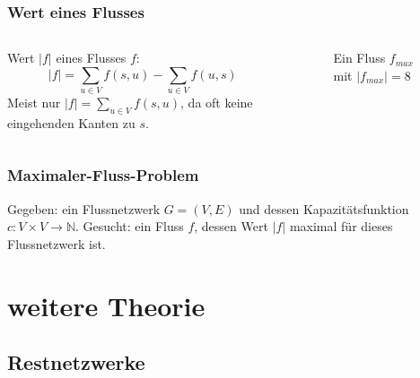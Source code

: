 \documentclass{beamer}
\begin{document}
\begin{frame}
\frametitle{Wert eines Flusses}
\begin{columns}
\begin{column}{.45\textwidth}
Wert $\lvert f \rvert$ eines Flusses $f$:
\begin{equation}
\lvert f \rvert = \sum_{u\in V} f(s,u) - \sum_{u\in V} f(u,s) \nonumber
\end{equation}
Meist nur $\lvert f \rvert = \sum_{u\in V} f(s,u)$, da oft keine eingehenden Kanten zu $s$.
\end{column}
\hfill
\pause
\begin{column}{.45\textwidth}
\begin{figure}
\begin{adjustbox}{width=\textwidth}
\end{adjustbox}
\caption{Ein Fluss $f_{max}$ mit $\lvert f_{max} \rvert = 8$}
\end{figure}
\end{column}
\end{columns}
\end{frame}

\begin{frame}
\frametitle{Maximaler-Fluss-Problem}
\begin{flushleft}
Gegeben: ein Flussnetzwerk $G = (V,E)$ und dessen Kapazitätsfunktion $c: V \times V \to \mathbb{N}$.\linebreak
Gesucht: ein Fluss $f$, dessen Wert $\lvert f \rvert$ maximal für dieses Flussnetzwerk ist.
\end{flushleft}
\end{frame}

\section{weitere Theorie}
\subsection{Restnetzwerke}
\end{document}
